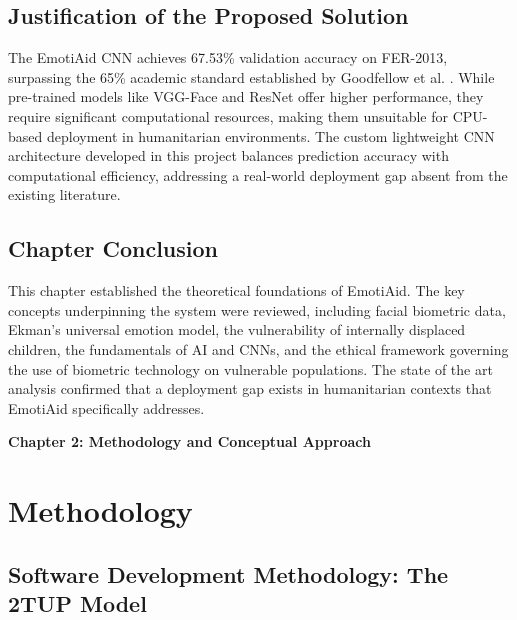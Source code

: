 \documentclass[a4paper,12pt,oneside]{report}
\begin{document}
\subsection{Justification of the Proposed Solution}

The EmotiAid CNN achieves 67.53\% validation accuracy on FER-2013, surpassing the
65\% academic standard established by Goodfellow et al. \cite{goodfellow2013}.
While pre-trained models like VGG-Face and ResNet offer higher performance, they
require significant computational resources, making them unsuitable for CPU-based
deployment in humanitarian environments. The custom lightweight CNN architecture
developed in this project balances prediction accuracy with computational
efficiency, addressing a real-world deployment gap absent from the existing
literature.

\subsection*{Chapter Conclusion}

This chapter established the theoretical foundations of EmotiAid. The key concepts
underpinning the system were reviewed, including facial biometric data, Ekman's
universal emotion model, the vulnerability of internally displaced children, the
fundamentals of AI and CNNs, and the ethical framework governing the use of
biometric technology on vulnerable populations. The state of the art analysis
confirmed that a deployment gap exists in humanitarian contexts that EmotiAid
specifically addresses.

\clearpage

\newpage
\thispagestyle{fancy}
{\LARGE \bfseries \noindent Chapter 2: Methodology and Conceptual Approach}
\vspace{2em}
\renewcommand{\thesection}{\Roman{section}}
\justifying

\section{Methodology}

\subsection{Software Development Methodology: The 2TUP Model}
\end{document}
